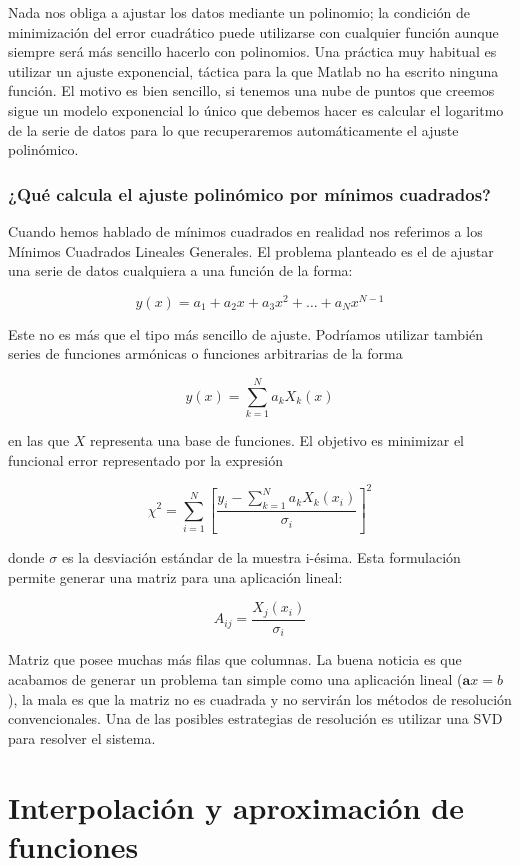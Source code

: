 Nada nos obliga a ajustar los datos mediante un polinomio; la condición
de minimización del error cuadrático puede utilizarse con cualquier
función aunque siempre será más sencillo hacerlo con polinomios. Una
práctica muy habitual es utilizar un ajuste exponencial, táctica para
la que Matlab no ha escrito ninguna función. El motivo es bien sencillo,
si tenemos una nube de puntos que creemos sigue un modelo exponencial
lo único que debemos hacer es calcular el logaritmo de la serie de
datos para lo que recuperaremos automáticamente el ajuste polinómico.


\subsubsection{¿Qué calcula el ajuste polinómico por mínimos cuadrados?
  \label{sub:=BFQu=E9-calcula-el}}

Cuando hemos hablado de mínimos cuadrados en realidad nos referimos a
los Mínimos Cuadrados Lineales Generales. El problema planteado es el
de ajustar una serie de datos cualquiera a una función de la forma:

$$
y(x)=a_{1}+a_{2}x+a_{3}x^{2}+\ldots+a_{N}x^{N-1}$$

Este no es más que el tipo más sencillo de ajuste. Podríamos utilizar
también series de funciones armónicas o funciones arbitrarias de la
forma

$$
y(x)=\sum_{k=1}^{N}a_{k}X_{k}(x)$$

en las que $X$ representa una base de funciones. El objetivo es
minimizar el funcional error representado por la expresión

$$
\chi^{2}=\sum_{i=1}^{N}\left[
  \frac{y_{i}-\sum_{k=1}^{N}a_{k}X_{k}(x_{i})}{\sigma_{i}}\right]^{2}
$$

donde $\sigma$ es la desviación estándar de la muestra i-ésima. Esta
formulación permite generar una matriz para una aplicación lineal:

$$
A_{ij}=\frac{X_{j}(x_{i})}{\sigma_{i}}$$

Matriz que posee muchas más filas que columnas. La buena noticia es
que acabamos de generar un problema tan simple como una aplicación
lineal ($\mathbf{a}x=b$), la mala es que la matriz no es cuadrada y no
servirán los métodos de resolución convencionales. Una de las posibles
estrategias de resolución es utilizar una SVD para resolver el
sistema.

\section{Interpolación y aproximación de funciones}

